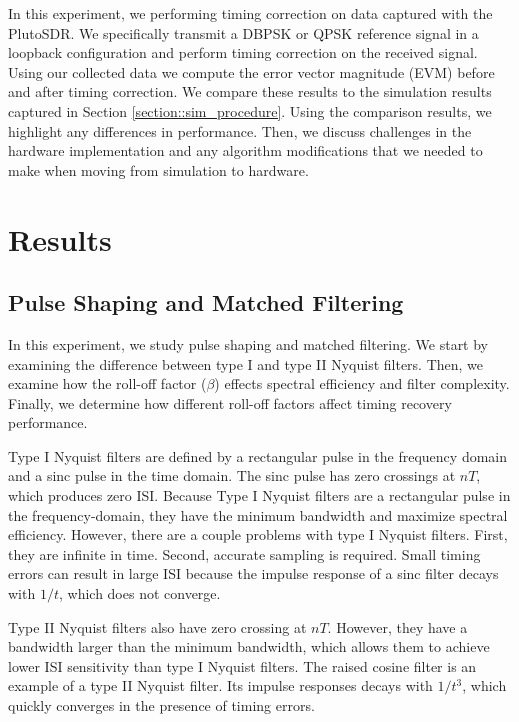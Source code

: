 \documentclass{article}
\begin{document}
In this experiment, we performing timing correction on data captured with the PlutoSDR. We specifically transmit a DBPSK or QPSK reference signal in a loopback configuration and perform timing correction on the received signal. Using our collected data we compute the error vector magnitude (EVM) before and after timing correction. We compare these results to the simulation results captured in Section \ref{section::sim_procedure}. Using the comparison results, we highlight any differences in performance. Then, we discuss challenges in the hardware implementation and any algorithm modifications that we needed to make when moving from simulation to hardware.

\section{Results}

\subsection{Pulse Shaping and Matched Filtering}

In this experiment, we study pulse shaping and matched filtering. We start by examining the difference between type I and type II Nyquist filters. Then, we examine how the roll-off factor ($\beta$) effects spectral efficiency and filter complexity. Finally, we determine how different roll-off factors affect timing recovery performance.

Type I Nyquist filters are defined by a rectangular pulse in the frequency domain and a sinc pulse in the time domain. The sinc pulse has zero crossings at $nT$, which produces zero ISI. Because Type I Nyquist filters are a rectangular pulse in the frequency-domain, they have the minimum bandwidth and maximize spectral efficiency. However, there are a couple problems with type I Nyquist filters. First, they are infinite in time. Second, accurate sampling is required. Small timing errors can result in large ISI because the impulse response of a sinc filter decays with $1/t$, which does not converge.

Type II Nyquist filters also have zero crossing at $nT$. However, they have a bandwidth larger than the minimum bandwidth, which allows them to achieve lower ISI sensitivity than type I Nyquist filters. The raised cosine filter is an example of a type II Nyquist filter. Its impulse responses decays with $1/t^3$, which quickly converges in the presence of timing errors.
\end{document}

